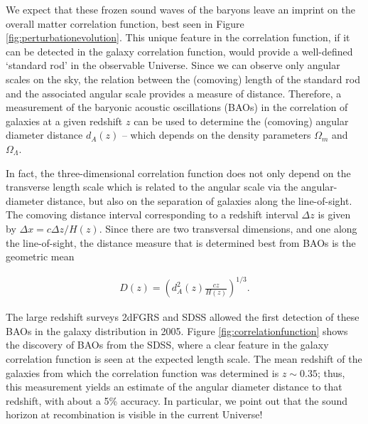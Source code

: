 \documentclass[a4paper,11pt]{article}
\begin{document}
{\noindent}We expect that these frozen sound waves of the baryons leave an imprint on the overall matter correlation function, best seen in Figure \ref{fig:perturbationevolution}. This unique feature in the correlation function, if it can be detected in the galaxy correlation function, would provide a well-defined `standard rod' in the observable Universe. Since we can observe only angular scales on the sky, the relation between the (comoving) length of the standard rod and the associated angular scale provides a measure of distance. Therefore, a measurement of the baryonic acoustic oscillations (BAOs) in the correlation of galaxies at a given redshift $z$ can be used to determine the (comoving) angular diameter distance $d_A(z)$ --  which depends on the density parameters $\Omega_m$ and $\Omega_\Lambda$.

{\noindent}In fact, the three-dimensional correlation function does not only depend on the transverse length scale which is related to the angular scale via the angular-diameter distance, but also on the separation of galaxies along the line-of-sight. The comoving distance interval corresponding to a redshift interval $\Delta z$ is given by $\Delta x=c\Delta z/H(z)$. Since there are two transversal dimensions, and one along the line-of-sight, the distance measure that is determined best from BAOs is the geometric mean

\begin{align*}
    D(z) = \left(d_A^2(z)\frac{cz}{H(z)}\right)^{1/3}.
\end{align*}

{\noindent}The large redshift surveys 2dFGRS and SDSS allowed the first detection of these BAOs in the galaxy distribution in 2005. Figure \ref{fig:correlationfunction} shows the discovery of BAOs from the SDSS, where a clear feature in the galaxy correlation function is seen at the expected length scale. The mean redshift of the galaxies from which the correlation function was determined is $z\sim0.35$; thus, this measurement yields an estimate of the angular diameter distance to that redshift, with about a 5\% accuracy. In particular, we point out that the sound horizon at recombination is visible in the current Universe!
\end{document}
